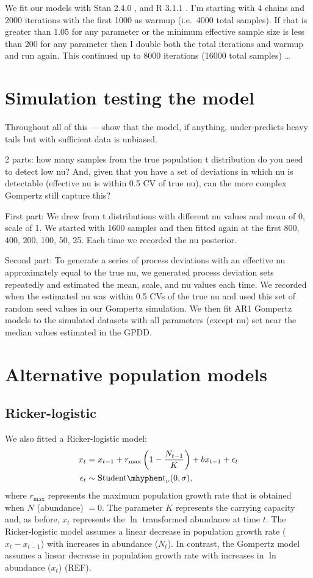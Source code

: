 \documentclass[12pt]{article}
\begin{document}
We fit our models with Stan 2.4.0 \citep{stan-manual2014}, and R 3.1.1 \citep{r2014}. I'm starting with 4 chains and 2000 iterations with the first 1000 as warmup (i.e.\ 4000 total samples). If rhat is greater than 1.05 for any parameter or the minimum effective sample size is less than 200 for any parameter then I double both the total iterations and warmup and run again. This continued up to 8000 iterations (16000 total samples) \ldots

\section{Simulation testing the model}

Throughout all of this --- show that the model, if anything, under-predicts heavy tails but with sufficient data is unbiased.

2 parts: how many samples from the true population t distribution do you need to detect low nu? And, given that you have a set of deviations in which nu is detectable (effective nu is within 0.5 CV of true nu), can the more complex Gompertz still capture this?

First part: We drew from t distributions with different nu values and mean of 0, scale of 1. We started with 1600 samples and then fitted again at the first 800, 400, 200,  100, 50, 25. Each time we recorded the nu posterior.

Second part: To generate a series of process deviations with an effective nu approximately equal to the true nu, we generated process deviation sets repeatedly and estimated the mean, scale, and nu values each time. We recorded when the estimated nu was within 0.5 CVs of the true nu and used this set of random seed values in our Gompertz simulation. We then fit AR1 Gompertz models to the simulated datasets with all parameters (except nu) set near the median values estimated in the GPDD.

\section{Alternative population models}

\subsection{Ricker-logistic}

We also fitted a Ricker-logistic model:
\begin{align*}
x_t &= x_{t-1} + r_{\mathrm{max}}\left(1 - \frac{N_{t-1}}{K}\right) + b x_{t-1} + \epsilon_t\\
\epsilon_t &\sim \mathrm{Student\mhyphen t}_\nu(0, \sigma),
\end{align*}
\noindent
where  $r_\mathrm{max}$ represents the maximum population growth rate that is obtained when $N$ (abundance) $= 0$. The parameter $K$ represents the carrying capacity and, as before, $x_t$ represents the $\ln$ transformed abundance at time $t$. The Ricker-logistic model assumes a linear decrease in population growth rate ($x_t - x_{t-1}$) with increases in abundance ($N_t$). In contrast, the Gompertz model assumes a linear decrease in population growth rate with increases in $\ln$ abundance ($x_t$) (REF).
\end{document}
